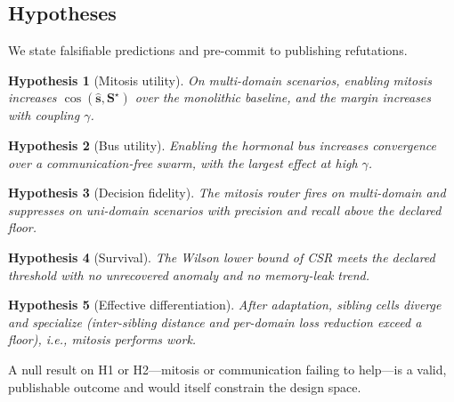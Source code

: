 \documentclass[11pt]{article}
\newtheorem{hypothesis}{Hypothesis}
\begin{document}
\subsection{Hypotheses}
We state falsifiable predictions and pre-commit to publishing refutations.
\begin{hypothesis}[Mitosis utility]
On multi-domain scenarios, enabling mitosis increases
$\cos(\hat{\mathbf{s}},\mathbf{S}^\star)$ over the monolithic baseline, and the
margin \emph{increases} with coupling $\gamma$.
\end{hypothesis}
\begin{hypothesis}[Bus utility]
Enabling the hormonal bus increases convergence over a communication-free swarm,
with the largest effect at high $\gamma$.
\end{hypothesis}
\begin{hypothesis}[Decision fidelity]
The mitosis router fires on multi-domain and suppresses on uni-domain scenarios
with precision and recall above the declared floor.
\end{hypothesis}
\begin{hypothesis}[Survival]
The Wilson lower bound of CSR meets the declared threshold with no unrecovered
anomaly and no memory-leak trend.
\end{hypothesis}
\begin{hypothesis}[Effective differentiation]
After adaptation, sibling cells diverge and specialize (inter-sibling distance
and per-domain loss reduction exceed a floor), i.e., mitosis performs work.
\end{hypothesis}
A null result on H1 or H2---mitosis or communication failing to help---is a
valid, publishable outcome and would itself constrain the design space.

\end{document}
